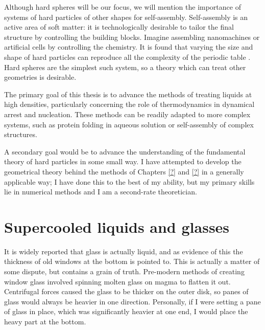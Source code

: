 \documentclass[11pt,twoside]{report}
\begin{document}
Although hard spheres will be our focus, we will mention the importance of systems of hard particles of other shapes for self-assembly.
Self-assembly is an active area of soft matter: it is technologically desirable to tailor the final structure by controlling the building blocks.
Imagine assembling nanomachines or artificial cells by controlling the chemistry.
It is found that varying the size and shape of hard particles can reproduce all the complexity of the periodic table \cite{Glotzer?,Dijkstra?}.
Hard spheres are the simplest such system, so a theory which can treat other geometries is desirable.

The primary goal of this thesis is to advance the methods of treating liquids at high densities, particularly concerning the role of thermodynamics in dynamical arrest and nucleation.
These methods can be readily adapted to more complex systems, such as protein folding in aqueous solution or self-assembly of complex structures.

A secondary goal would be to advance the understanding of the fundamental theory of hard particles in some small way.
I have attempted to develop the geometrical theory behind the methods of Chapters \ref{?} and \ref{?} in a generally applicable way;
I have done this to the best of my ability, but my primary skills lie in numerical methods and I am a second-rate theoretician.

\section{Supercooled liquids and glasses}

It is widely reported that glass is actually liquid, and as evidence of this the thickness of old windows at the bottom is pointed to.
This is actually a matter of some dispute, but contains a grain of truth.
Pre-modern methods of creating window glass involved spinning molten glass on magma to flatten it out.
Centrifugal forces caused the glass to be thicker on the outer disk, so panes of glass would always be heavier in one direction.
Personally, if I were setting a pane of glass in place, which was significantly heavier at one end, I would place the heavy part at the bottom.
\end{document}
